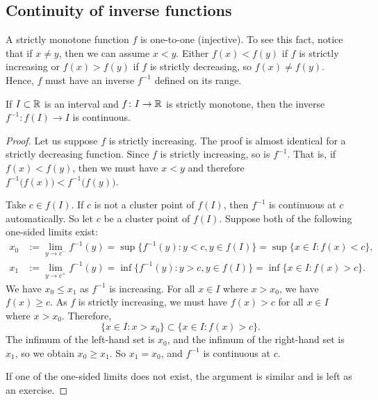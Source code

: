 \subsection{Continuity of inverse functions}


A strictly monotone function $f$ is one-to-one (injective).
To see this fact,
notice that if $x \not= y$, then we can assume $x < y$.  Either $f(x) <
f(y)$ if $f$ is strictly increasing or $f(x) > f(y)$ if $f$ is strictly
decreasing, so $f(x) \not= f(y)$.
Hence, $f$ must have an inverse $f^{-1}$ defined on its range.

\begin{prop} \label{prop:invcont}
If $I \subset {\mathbb{R}}$ is an interval and $f \colon I \to {\mathbb{R}}$ is strictly
monotone, then the inverse $f^{-1} \colon f(I) \to I$ is continuous.
\end{prop}

\begin{proof}
Let us suppose $f$ is strictly increasing.  The proof is almost
identical for a strictly decreasing function.
Since $f$ is strictly increasing, so is $f^{-1}$.  That is, if $f(x) <
f(y)$, then we must have $x < y$ and therefore
$f^{-1}\bigl(f(x)\bigr) < f^{-1}\bigl(f(y)\bigr)$.

Take $c \in f(I)$.
If $c$ is not a cluster point of $f(I)$, then $f^{-1}$ is continuous at $c$
automatically.  So let $c$ be a cluster point of $f(I)$.
Suppose both of the following one-sided limits exist:
\begin{align*}
x_0 & := \lim_{y \to c^-} f^{-1}(y) =
\sup \bigl\{ f^{-1}(y) : y < c, y \in f(I) \bigr\}
=
\sup \bigl\{ x \in I : f(x) < c \bigr\} , \\
x_1 & := \lim_{y \to c^+} f^{-1}(y) =
\inf \bigl\{ f^{-1}(y) : y > c, y \in f(I) \bigr\}
=
\inf \bigl\{ x \in I : f(x) > c \bigr\} .
\end{align*}
We have $x_0 \leq x_1$ as $f^{-1}$ is increasing.
For all $x \in I$ where $x > x_0$, we have $f(x) \geq c$.  As $f$ is strictly increasing,
we must have $f(x) > c$ for all $x \in I$ where $x > x_0$.  Therefore,
\begin{equation*}
\{ x \in I : x > x_0 \} \subset \bigl\{ x \in I : f(x) > c \bigr\}.
\end{equation*}
The infimum of the left-hand set is $x_0$, and the infimum of the right-hand
set is $x_1$, so we obtain $x_0 \geq x_1$.
So $x_1 = x_0$, and $f^{-1}$ is continuous at $c$.

If one of the one-sided limits does not exist, the argument is similar
and is left as an exercise.
\end{proof}

